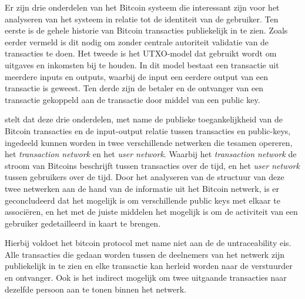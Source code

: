 

Er zijn drie onderdelen van het Bitcoin systeem die interessant zijn voor het analyseren van het systeem in relatie tot de identiteit van de gebruiker. Ten eerste is de gehele historie van Bitcoin transacties publiekelijk in te zien. Zoals eerder vermeld is dit nodig om zonder centrale autoriteit validatie van de transacties te doen. Het tweede is het UTXO-model dat gebruikt wordt om uitgaves en inkomsten bij te houden. In dit model bestaat een transactie uit meerdere inputs en outputs, waarbij de input een eerdere output van een transactie is geweest. Ten derde zijn de betaler en de ontvanger van een transactie gekoppeld aan de transactie door middel van een public key. 

\cite{reid2013analysis} stelt dat deze drie onderdelen, met name de publieke toegankelijkheid van de Bitcoin transacties en de input-output relatie tussen transacties en public-keys, ingedeeld kunnen worden in twee verschillende netwerken die tesamen opereren, het \textit{transaction network} en het \textit{user network}. Waarbij het \textit{transaction network} de stroom van Bitcoins beschrijft tussen transacties over de tijd, en het \textit{user network} tussen gebruikers over de tijd. Door het analyseren van de structuur van deze twee netwerken aan de hand van de informatie uit het Bitcoin netwerk, is er geconcludeerd dat het mogelijk is om verschillende public keys met elkaar te associëren, en het met de juiste middelen het mogelijk is om de activiteit van een gebruiker gedetailleerd in kaart te brengen.

Hierbij voldoet het bitcoin protocol met name niet aan de de untraceability eis. Alle transacties die gedaan worden tussen de deelnemers van het netwerk zijn publiekelijk in te zien en elke transactie kan herleid worden naar de verstuurder en ontvanger. Ook is het indirect mogelijk om twee uitgaande transacties naar dezelfde persoon aan te tonen binnen het netwerk.
